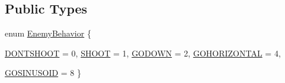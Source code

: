\subsection*{Public Types}
\begin{DoxyCompactItemize}
\item 
enum \hyperlink{class_enemy_adb5a490a94eea508ae08cfb4191c150d}{EnemyBehavior} \{ \par
\hyperlink{class_enemy_adb5a490a94eea508ae08cfb4191c150dae93ec5a5ff9d28f3304914469a94dbc7}{DONTSHOOT} =  0, 
\hyperlink{class_enemy_adb5a490a94eea508ae08cfb4191c150dacc6cf73406f7239ae190ad8734cf3126}{SHOOT} =  1, 
\hyperlink{class_enemy_adb5a490a94eea508ae08cfb4191c150daa06c1e85818b1e847c9e7fbb8af44fde}{GODOWN} =  2, 
\hyperlink{class_enemy_adb5a490a94eea508ae08cfb4191c150daae083aa385ad29e0827b0ee3d26c6b02}{GOHORIZONTAL} =  4, 
\par
\hyperlink{class_enemy_adb5a490a94eea508ae08cfb4191c150dada16e0f48368c09a17be644121f20f30}{GOSINUSOID} =  8
 \}
\end{DoxyCompactItemize}
